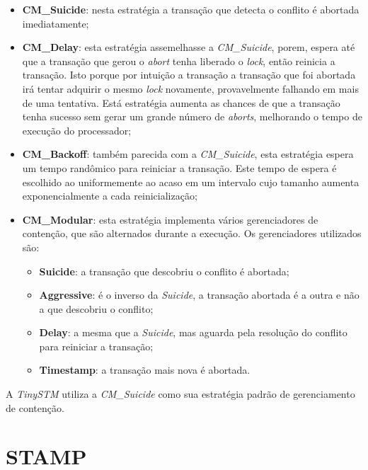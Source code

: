\documentclass[diss,capa]{texufpel}
\begin{document}
\begin{itemize}
 \item \textbf{CM\_Suicide}: nesta estratégia a transação que detecta o conflito é abortada imediatamente;

 \item \textbf{CM\_Delay}: esta estratégia assemelhasse a \emph{CM\_Suicide}, porem, espera até que a transação que gerou o \emph{abort} tenha liberado o \emph{lock}, então reinicia a transação. Isto porque por intuição a transação a transação que foi abortada irá tentar adquirir o mesmo \emph{lock} novamente, provavelmente falhando em mais de uma tentativa. Está estratégia aumenta as chances de que a transação tenha sucesso sem gerar um grande número de \emph{aborts}, melhorando o tempo de execução do processador;

 \item \textbf{CM\_Backoff}: também parecida com a \emph{CM\_Suicide}, esta estratégia espera um tempo randômico para reiniciar a transação. Este tempo de espera é escolhido ao uniformemente ao acaso em um intervalo cujo tamanho aumenta exponencialmente a cada reinicialização;

 \item \textbf{CM\_Modular}: esta estratégia implementa vários gerenciadores de contenção, que são alternados durante a execução. Os gerenciadores utilizados são:

    \begin{itemize}
       \item \textbf{Suicide}: a transação que descobriu o conflito é abortada;

       \item \textbf{Aggressive}: é o inverso da \emph{Suicide}, a transação abortada é a outra e não a que descobriu o conflito;

       \item \textbf{Delay}: a mesma que a \emph{Suicide}, mas aguarda pela resolução do conflito para reiniciar a transação;

       \item \textbf{Timestamp}: a transação mais nova é abortada.
    \end{itemize}

\end{itemize}

A \emph{TinySTM} utiliza a \emph{CM\_Suicide} como sua estratégia padrão de gerenciamento de contenção.

\section{STAMP}
\label{section:stamp}
\end{document}
